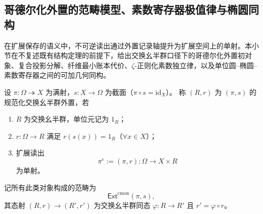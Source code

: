 \subsection{哥德尔化外置的范畴模型、素数寄存器极值律与椭圆同构}\label{subsec:conclusion-godel-externalization-prime-register-entropy-ellipse}
在扩展保存的语义中，不可逆读出通过外置记录轴提升为扩展空间上的单射。本小节在不复述既有结构定理的前提下，给出交换幺半群口径下的哥德尔化外置初对象、复合投影分解、纤维最小账本代价、\(\zeta\)-正则化素数独立律，以及单位圆--椭圆--素数寄存器之间的可加几何同构。

\begin{definition}[规范化交换幺半群外置]\label{def:conclusion-cmon-externalization}
设 \(\pi:\Omega\twoheadrightarrow X\) 为满射，\(s:X\to\Omega\) 为截面（\(\pi\circ s=\mathrm{id}_X\)）。
称 \((R,r)\) 为 \((\pi,s)\) 的规范化交换幺半群外置，若
\begin{enumerate}
  \item \(R\) 为交换幺半群，单位元记为 \(1_R\)；
  \item \(r:\Omega\to R\) 满足 \(r(s(x))=1_R\)（\(\forall x\in X\)）；
  \item 扩展读出
  \[
  \pi^e:=(\pi,r):\Omega\to X\times R
  \]
  为单射。
\end{enumerate}
记所有此类对象构成的范畴为
\[
\mathsf{Ext}^{\mathrm{cmon}}(\pi,s),
\]
其态射 \((R,r)\to(R',r')\) 为交换幺半群同态 \(\varphi:R\to R'\) 且 \(r'=\varphi\circ r\)。
\end{definition}

